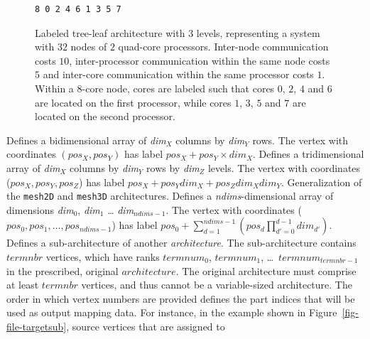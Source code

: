 \begin{itemize}
\begin{figure}[hbt]
\begin{center}
\begin{minipage}[b]{6cm}
{\begin{verbatim}
8 0 2 4 6 1 3 5 7
\end{verbatim}
}\end{minipage}
\end{center}
\caption{Labeled tree-leaf architecture with $3$ levels, representing
a system with $32$ nodes of $2$ quad-core processors. Inter-node
communication costs $10$, inter-processor communication within the
same node costs $5$ and inter-core communication within the same
processor costs $1$. Within a $8$-core node, cores are labeled such
that cores $0$, $2$, $4$ and $6$ are located on the first processor,
while cores $1$, $3$, $5$ and $7$ are located on the second processor.}
\label{fig-file-targetltleaf}
\end{figure}
Defines a bidimensional array of {\it dim$_X$} columns by {\it dim$_Y$}
rows. The vertex with coordinates $(\mathit{pos_X},\mathit{pos_Y})$
has label $\mathit{pos_X} + \mathit{pos_Y} \times \mathit{dim_X}$.
Defines a tridimensional array of {\it dim$_X$} columns by {\it dim$_Y$}
rows by {\it dim$_Z$} levels. The vertex with coordinates
($\mathit{pos_X},\mathit{pos_Y},\mathit{pos_Z}$) has label
$\mathit{pos_X} + \mathit{pos_Y} \mathit{dim_X} + \mathit{pos_Z} \mathit{dim_X} \mathit{dim_Y}$.
Generalization of the \texttt{mesh2D} and \texttt{mesh3D}
architectures. Defines a \textit{ndims}-dimensional array of
dimensions \textit{dim$_0$}, \textit{dim$_1$} \ldots
\textit{dim$_{ndims - 1}$}. The vertex with coordinates 
($\mathit{pos_0},\mathit{pos_1},\ldots,\mathit{pos_{ndims - 1}}$)
has label $\mathit{pos_0} + \sum_{d=1}^{ndims - 1}\left(\mathit{pos_d} \prod_{d'=0}^{d-1}\mathit{dim_{d'}}\right)$.
Defines a sub-architecture of another \textit{architecture}. The
sub-architecture contains $\mathit{termnbr}$ vertices, which have
ranks $\mathit{termnum}_0$, $\mathit{termnum}_1$,
\ldots\ $\mathit{termnum}_{\mathit{termnbr}-1}$ in the prescribed,
original $\mathit{architecture}$. The original architecture must
comprise at least $\mathit{termnbr}$ vertices, and thus cannot be a
variable-sized architecture. The order in which vertex numbers are
provided defines the part indices that will be used as output
mapping data. For instance, in the example shown in
Figure~\ref{fig-file-targetsub}, source vertices that are assigned to

\end{itemize}

